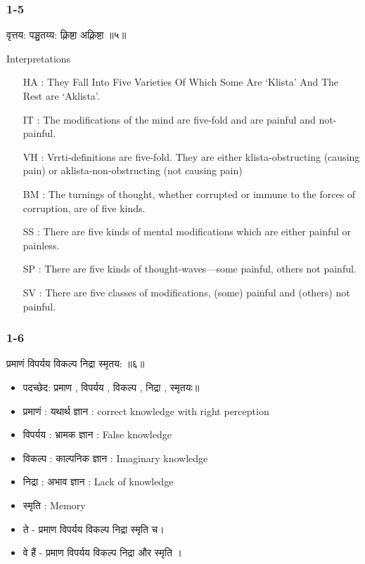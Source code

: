 \begin{frame}[fragile]\frametitle{1-5}

\begin{sanskrit}
वृत्तय: पञ्चतय्य: क्लिष्टा अक्लिष्टा ॥५॥
\end{sanskrit}


Interpretations
\begin{itemize}		
\item [HA]: They Fall Into Five Varieties Of Which Some Are ‘Klista’ And The Rest are ‘Aklista’.
\item [IT]: The modifications of the mind are five-fold and are painful and not-painful.
\item [VH]: Vrrti-definitions are five-fold. They are either klista-obstructing (causing pain) or aklista-non-obstructing (not causing pain)
\item [BM]: The turnings of thought, whether corrupted or immune to the forces of corruption, are of five kinds.
\item [SS]: There are five kinds of mental modifications which are either painful or painless.
\item [SP]: There are five kinds of thought-waves—some painful, others not painful.
\item [SV]: There are five classes of modifications, (some) painful and (others) not painful.
\end{itemize}

\end{frame}



\begin{frame}[fragile]\frametitle{1-6}

\begin{sanskrit}
 प्रमाणं विपर्यय विकल्प निद्रा स्मृतय: ॥६॥
\end{sanskrit}


	\begin{itemize}
	\item पदच्छेद: प्रमाण , विपर्यय , विकल्प , निद्रा , स्मृतयः॥
	\item प्रमाणं : यथार्थ ज्ञान : correct knowledge with right perception
	\item विपर्यय : भ्रामक ज्ञान : False knowledge
	\item विकल्प : काल्पनिक ज्ञान : Imaginary knowledge
	\item निद्रा : अभाव ज्ञान : Lack of knowledge
	\item स्मृति : Memory
	\item  ते - प्रमाण विपर्यय विकल्प निद्रा स्मृति च।
	\item वे हैं - प्रमाण विपर्यय विकल्प निद्रा और स्मृति ।	
	\end{itemize}	

\end{frame}

